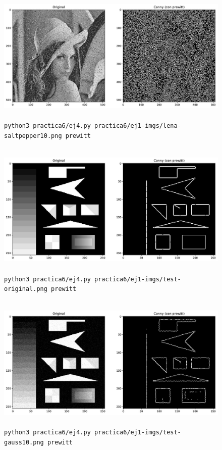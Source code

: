 \documentclass[11pt, spanish]{article}
\begin{document}
\begin{figure}[H]
\centering
    \includegraphics[height=6.5cm]{informe-imgs/ej4-prewitt-lena-saltpepper10.jpg}
    \caption{\texttt{python3 practica6/ej4.py practica6/ej1-imgs/lena-saltpepper10.png prewitt}}
\end{figure}


\begin{figure}[H]
\centering
    \includegraphics[height=6.5cm]{informe-imgs/ej4-prewitt-test-original.jpg}
    \caption{\texttt{python3 practica6/ej4.py practica6/ej1-imgs/test-original.png prewitt}}
\end{figure}

\begin{figure}[H]
\centering
    \includegraphics[height=6.5cm]{informe-imgs/ej4-prewitt-test-gauss10.jpg}
    \caption{\texttt{python3 practica6/ej4.py practica6/ej1-imgs/test-gauss10.png prewitt}}
\end{figure}
\end{document}
